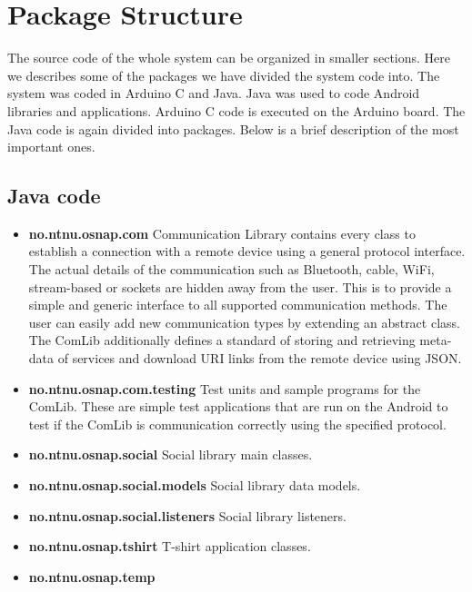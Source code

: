 \section{Package Structure}
The source code of the whole system can be organized in smaller sections.
Here we describes some of the packages we have divided the system code into.
The system was coded in Arduino C and Java. Java was used to code Android libraries and applications.
Arduino C code is executed on the Arduino board. The Java code is again divided into packages.
Below is a brief description of the most important ones.

\subsection{Java code}
\begin{itemize}
	\item \textbf{no.ntnu.osnap.com}\newline
		Communication Library contains every class to establish a connection with a remote device using a general
		protocol interface. The actual details of the communication such as Bluetooth, cable, WiFi, stream-based or
		sockets are hidden away from the user. This is to provide a simple and generic interface to all supported
		communication methods. The user can easily add new communication types by extending an abstract class.
		The ComLib additionally defines a standard of storing and retrieving meta-data of services and download URI
		links from the remote device using JSON.
	\item \textbf{no.ntnu.osnap.com.testing}\newline
		Test units and sample programs for the ComLib. These are simple test applications that are run on
		the Android to test if the ComLib is communication correctly using the specified
		protocol.
	\item \textbf{no.ntnu.osnap.social}\newline
		Social library main classes.
	\item \textbf{no.ntnu.osnap.social.models}\newline
		Social library data models.
	\item \textbf{no.ntnu.osnap.social.listeners}\newline
		Social library listeners.
	\item \textbf{no.ntnu.osnap.tshirt}\newline
		T-shirt application classes.
	\item \textbf{no.ntnu.osnap.temp}\newline

\end{itemize}

